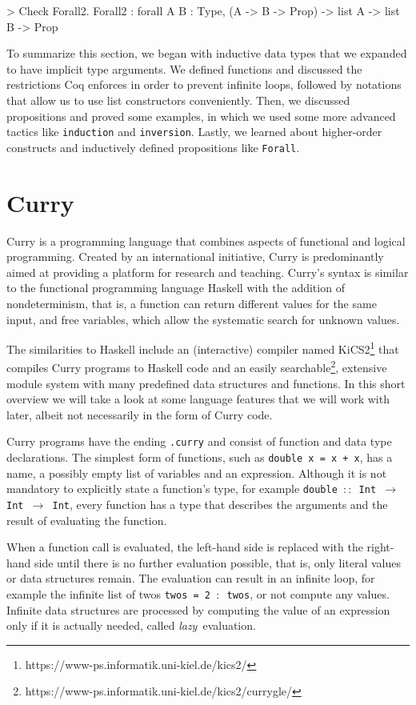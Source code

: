 \documentclass[paper = a4, fleqn, twoside]{scrreprt}
\newcommand{\coqinline}[1]{\texttt{#1}}
\begin{document}
\begin{coqcode}
> Check Forall2.
Forall2 : forall A B : Type, (A -> B -> Prop) -> list A -> list B -> Prop
\end{coqcode}
To summarize this section, we began with inductive data types that we expanded to have implicit type arguments. We defined functions and discussed the restrictions Coq enforces in order to prevent infinite loops, followed by notations that allow us to use list constructors conveniently. Then, we discussed propositions and proved some examples, in which we used some more advanced tactics like \coqinline{induction} and \coqinline{inversion}. Lastly, we learned about higher-order constructs and inductively defined propositions like \coqinline{Forall}.
\section{Curry}
Curry\citet{report} is a programming language that combines aspects of functional and logical programming. Created by an international initiative, Curry is predominantly aimed at providing a platform for research and teaching. Curry's syntax is similar to the functional programming language Haskell with the addition of nondeterminism, that is, a function can return different values for the same input, and free variables, which allow the systematic search for unknown values.
\par
The similarities to Haskell include an (interactive) compiler named KiCS2\footnote{https://www-ps.informatik.uni-kiel.de/kics2/} that compiles Curry programs to Haskell code and  an easily searchable\footnote{https://www-ps.informatik.uni-kiel.de/kics2/currygle/}, extensive module system with many predefined data structures and functions. In this short overview we will take a look at some language features that we will work with later, albeit not necessarily in the form of Curry code.\\
\par\noindent
Curry programs have the ending \texttt{.curry} and consist of function and data type declarations. The simplest form of functions, such as \texttt{double x = x + x}, has a name, a possibly empty list of variables and an expression. Although it is not mandatory to explicitly state a function's type, for example \texttt{double $::$ Int $\rightarrow$ Int $\rightarrow$ Int}, every function has a type that describes the arguments and the result of evaluating the function. 
\par
When a function call is evaluated, the left-hand side is replaced with the right-hand side until there is no further evaluation possible, that is, only literal values or data structures remain. The evaluation can result in an infinite loop, for example the infinite list of twos \texttt{twos = 2 $:$ twos}, or not compute any values. Infinite data structures are processed by computing the value of an expression only if it is actually needed, called \mbox{\textit{lazy} evaluation.}\\
\end{document}
